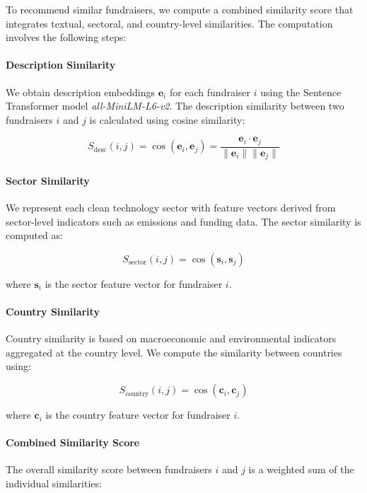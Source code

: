 \documentclass[sigconf]{acmart}
\begin{document}
To recommend similar fundraisers, we compute a combined similarity score that integrates textual, sectoral, and country-level similarities. The computation involves the following steps:

\paragraph{Description Similarity}

We obtain description embeddings $\mathbf{e}_i$ for each fundraiser $i$ using the Sentence Transformer model \textit{all-MiniLM-L6-v2}. The description similarity between two fundraisers $i$ and $j$ is calculated using cosine similarity:

\[
S_{\text{desc}}(i, j) = \cos(\mathbf{e}_i, \mathbf{e}_j) = \frac{\mathbf{e}_i \cdot \mathbf{e}_j}{\|\mathbf{e}_i\| \|\mathbf{e}_j\|}
\]

\paragraph{Sector Similarity}

We represent each clean technology sector with feature vectors derived from sector-level indicators such as emissions and funding data. The sector similarity is computed as:

\[
S_{\text{sector}}(i, j) = \cos(\mathbf{s}_i, \mathbf{s}_j)
\]

where $\mathbf{s}_i$ is the sector feature vector for fundraiser $i$.

\paragraph{Country Similarity}

Country similarity is based on macroeconomic and environmental indicators aggregated at the country level. We compute the similarity between countries using:

\[
S_{\text{country}}(i, j) = \cos(\mathbf{c}_i, \mathbf{c}_j)
\]

where $\mathbf{c}_i$ is the country feature vector for fundraiser $i$.

\paragraph{Combined Similarity Score}

The overall similarity score between fundraisers $i$ and $j$ is a weighted sum of the individual similarities:
\end{document}
